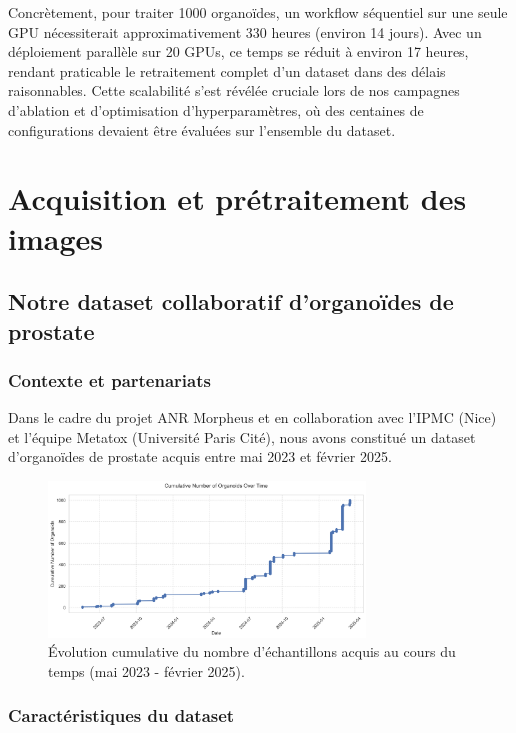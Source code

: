 Concrètement, pour traiter 1000 organoïdes, un workflow séquentiel sur une seule GPU nécessiterait approximativement 330 heures (environ 14 jours). Avec un déploiement parallèle sur 20 GPUs, ce temps se réduit à environ 17 heures, rendant praticable le retraitement complet d'un dataset dans des délais raisonnables. Cette scalabilité s'est révélée cruciale lors de nos campagnes d'ablation et d'optimisation d'hyperparamètres, où des centaines de configurations devaient être évaluées sur l'ensemble du dataset.

\section{Acquisition et prétraitement des images}

\subsection{Notre dataset collaboratif d'organoïdes de prostate}

\subsubsection{Contexte et partenariats}

Dans le cadre du projet ANR Morpheus et en collaboration avec l'IPMC (Nice) et l'équipe Metatox (Université Paris Cité), nous avons constitué un dataset d'organoïdes de prostate acquis entre mai 2023 et février 2025.

\begin{figure}[htbp]
    \centering
    \includegraphics[width=0.75\textwidth]{../img/cumulative_organoids.png}
    \caption{Évolution cumulative du nombre d'échantillons acquis au cours du temps (mai 2023 - février 2025).}
    \label{fig:cumulative_organoids}
\end{figure}

\subsubsection{Caractéristiques du dataset}

